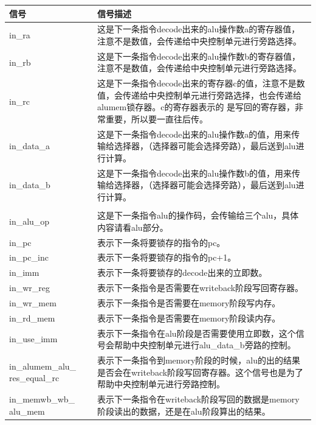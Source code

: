 \begin{center}
    \label{table:idalu}
    \begin{longtable}{p{}p{}}
        \toprule
        信号 & 信号描述 \\
        \midrule
        in\_ra  & 这是下一条指令decode出来的alu操作数a的寄存器值，注意不是数值，会传递给中央控制单元进行旁路选择。 \\
        in\_rb &  这是下一条指令decode出来的alu操作数b的寄存器值，注意不是数值，会传递给中央控制单元进行旁路选择。\\
        in\_rc &  这是下一条指令decode出来的寄存器c的值，注意不是数值，会传递给中央控制单元进行旁路选择，也会传递给alumem锁存器。c的寄存器表示的
        是写回的寄存器，非常重要，所以要一直往后传。\\
        in\_data\_a &  这是下一条指令decode出来的alu操作数a的值，用来传输给选择器，（选择器可能会选择旁路），最后送到alu进行计算。 \\
        in\_data\_b &  这是下一条指令decode出来的alu操作数b的值，用来传输给选择器，（选择器可能会选择旁路），最后送到alu进行计算。 \\\\
        in\_alu\_op &  这是下一条指令alu的操作码，会传输给三个alu，具体内容请看alu部分。\\
        in\_pc &  表示下一条将要锁存的指令的pc。\\
        in\_pc\_inc &  表示下一条将要锁存的指令的pc+1。\\
        in\_imm &  表示下一条将要锁存的decode出来的立即数。\\
        in\_wr\_reg &  表示下一条指令是否需要在writeback阶段写回寄存器。\\
        in\_wr\_mem &  表示下一条指令是否需要在memory阶段写内存。\\
        in\_rd\_mem &  表示下一条指令是否需要在memory阶段读内存。\\
        in\_use\_imm & 表示下一条指令在alu阶段是否需要使用立即数，这个信号会帮助中央控制单元进行alu\_data\_b旁路的控制。 \\
        in\_alumem\_alu\_  res\_equal\_rc &  表示下一条指令到memory阶段的时候，alu的出的结果是否会在writeback阶段写回寄存器。这个信号也是为了帮助中央控制单元进行旁路控制。\\
        in\_memwb\_wb\_  alu\_mem &  表示下一条指令在writeback阶段写回的数据是memory阶段读出的数据，还是在alu阶段算出的结果。\\

\end{longtable}
\end{center}
